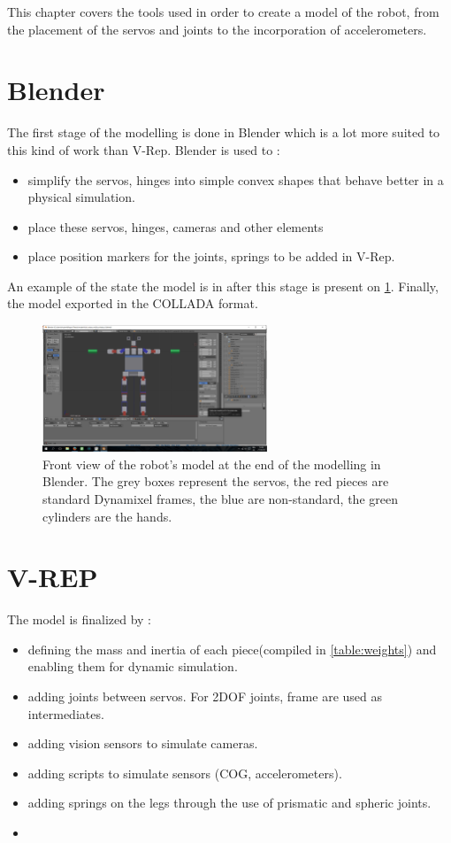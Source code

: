 This chapter covers the tools used in order to create a model of the robot, from the placement of the servos and joints to the incorporation of accelerometers.

\section{Blender}
The first stage of the modelling is done in Blender which is a lot more suited to this kind of work than V-Rep. 
Blender is used to :
\begin{itemize}
\item simplify the servos, hinges into simple convex shapes that behave better in a physical simulation.
\item place these servos, hinges, cameras and other elements
\item place position markers for the joints, springs to be added in V-Rep.
\end{itemize}
An example of the state the model is in after this stage is present on \cref{fig:modelling_blender}. Finally, the model exported in the COLLADA format.

\begin{figure}[htp]
\center
\includegraphics[width=0.6\textwidth]{figures/modelling_blender}
\caption[Front view of the robot's model at the end of the modelling in Blender]{Front view of the robot's model at the end of the modelling in Blender. The grey boxes represent the servos, the red pieces are standard Dynamixel frames, the blue are non-standard, the green cylinders are the hands.}
\label{fig:modelling_blender}
\end{figure}

\section{V-REP}
The model is finalized by :
\begin{itemize}
\item defining the mass and inertia of each piece(compiled in \cref{table:weights}) and enabling them for dynamic simulation.
\item adding joints between servos. For 2DOF joints, frame are used as intermediates.
\item adding vision sensors to simulate cameras.
\item adding scripts to simulate sensors (COG, accelerometers).
\item adding springs on the legs through the use of prismatic and spheric joints.
\item
\end{itemize}

